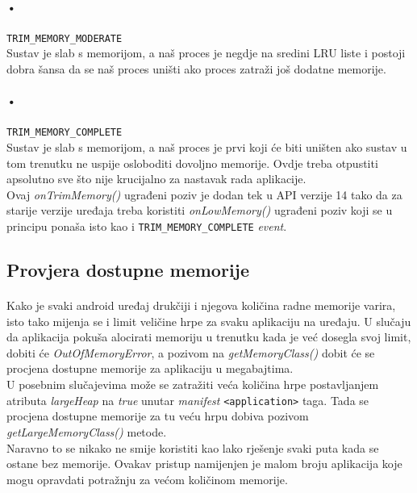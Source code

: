 \documentclass[times, utf8, zavrsni]{fer}
\begin{document}
\paragraph{•}
\verb|TRIM_MEMORY_MODERATE|\\
Sustav je slab s memorijom, a naš proces je negdje na sredini LRU liste i postoji dobra šansa da se naš proces uništi ako proces zatraži još dodatne memorije.

\paragraph{•}
\verb|TRIM_MEMORY_COMPLETE|\\
Sustav je slab s memorijom, a naš proces je prvi koji će biti uništen ako sustav u tom trenutku ne uspije osloboditi dovoljno memorije. Ovdje treba otpustiti apsolutno sve što nije krucijalno za nastavak rada aplikacije.\\

Ovaj \textit{onTrimMemory()} ugrađeni poziv je dodan tek u API verzije 14 tako da za starije verzije uređaja treba koristiti \textit{onLowMemory()} ugrađeni poziv koji se u principu ponaša isto kao i \verb|TRIM_MEMORY_COMPLETE| \textit{event}.

\subsection{Provjera dostupne memorije}
\paragraph{}
Kako je svaki android uređaj drukčiji i njegova količina radne memorije varira, isto tako mijenja se i limit veličine hrpe za svaku aplikaciju na uređaju. U slučaju da aplikacija pokuša alocirati memoriju u trenutku kada je već dosegla svoj limit, dobiti će \textit{OutOfMemoryError}, a pozivom na \textit{getMemoryClass()} dobit će se procjena dostupne memorije za aplikaciju u megabajtima.\\

U posebnim slučajevima može se zatražiti veća količina hrpe postavljanjem atributa \textit{largeHeap} na \textit{true} unutar \textit{manifest} \verb|<application>| taga. Tada se procjena dostupne memorije za tu veću hrpu dobiva pozivom \textit{getLargeMemoryClass()} metode.\\

Naravno to se nikako ne smije koristiti kao lako rješenje svaki puta kada se ostane bez memorije. Ovakav pristup namijenjen je malom broju aplikacija koje mogu opravdati potražnju za većom količinom memorije.
\end{document}
